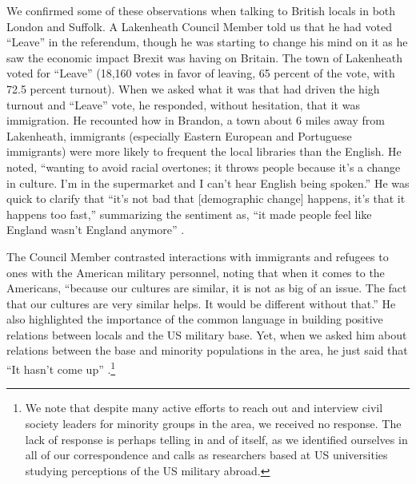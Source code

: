 We confirmed some of these observations when talking to British locals in both London and Suffolk. A Lakenheath Council Member told us that he had voted ``Leave'' in the referendum, though he was starting to change his mind on it as he saw the economic impact Brexit was having on Britain. The town of Lakenheath voted for ``Leave'' (18,160 votes in favor of leaving, 65 percent of the vote, with 72.5 percent turnout). When we asked what it was that had driven the high turnout and ``Leave'' vote, he responded, without hesitation, that it was immigration. He recounted how in Brandon, a town about 6 miles away from Lakenheath, immigrants (especially Eastern European and Portuguese immigrants) were more likely to frequent the local libraries than the English. He noted, ``wanting to avoid racial overtones; it throws people because it's a change in culture. I'm in the supermarket and I can't hear English being spoken.'' He was quick to clarify that ``it's not bad that [demographic change] happens, it's that it happens too fast,'' summarizing the sentiment as, ``it made people feel like England wasn't England anymore'' \cite{councilone20190718}.

The Council Member contrasted interactions with immigrants and refugees to ones with the American military personnel, noting that when it comes to the Americans, ``because our cultures are similar, it is not as big of an issue. The fact that our cultures are very similar helps. It would be different without that.'' He also highlighted the importance of the common language in building positive relations between locals and the US military base. Yet, when we asked him about relations between the base and minority populations in the area, he just said that ``It hasn't come up'' \cite{councilone20190718}.\footnote{We note that despite many active efforts to reach out and interview civil society leaders for minority groups in the area, we received no response. The lack of response is perhaps telling in and of itself, as we identified ourselves in all of our correspondence and calls as researchers based at US universities studying perceptions of the US military abroad.}

